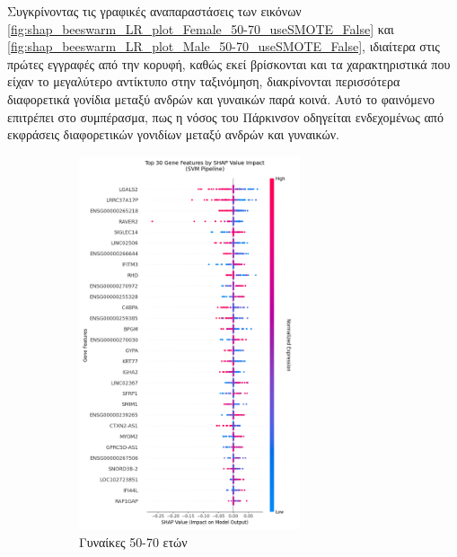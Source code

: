 \documentclass[12pt]{report}
\begin{document}
        \par
            Συγκρίνοντας τις γραφικές αναπαραστάσεις των εικόνων \ref{fig:shap_beeswarm_LR_plot_Female_50-70_useSMOTE_False} και \ref{fig:shap_beeswarm_LR_plot_Male_50-70_useSMOTE_False}, ιδιαίτερα στις πρώτες εγγραφές από την κορυφή, καθώς εκεί βρίσκονται και τα χαρακτηριστικά που είχαν το μεγαλύτερο αντίκτυπο στην ταξινόμηση, διακρίνονται περισσότερα διαφορετικά γονίδια μεταξύ ανδρών και γυναικών παρά κοινά. Αυτό το φαινόμενο επιτρέπει στο συμπέρασμα, πως η νόσος του Πάρκινσον οδηγείται ενδεχομένως από εκφράσεις διαφορετικών γονιδίων μεταξύ ανδρών και γυναικών.
            
            \begin{figure}[H]
                \centering
                \begin{subfigure}[b]{0.45\textwidth}
                    \centering
                    \includegraphics[height=11cm,width=\textwidth,keepaspectratio]{ML/Predict/DEG/SHAP/SVM/shap_beeswarm_plot_Female_50-70_useSMOTE_False.png}
                    \caption{Γυναίκες 50-70 ετών}
                    \label{fig:shap_beeswarm_SVM_plot_Female_50-70_useSMOTE_False}
                \end{subfigure}
                \hfill
                \begin{subfigure}[b]{0.45\textwidth}
                    \centering

\end{subfigure}
\end{figure}
\end{document}
